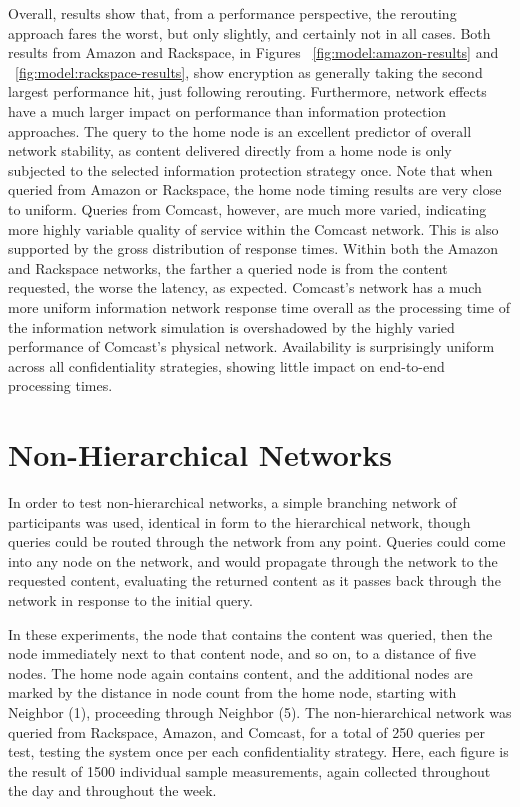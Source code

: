 Overall, results show that, from a performance perspective, the rerouting approach fares the worst, but only slightly, and certainly not in all cases.  Both results from Amazon and Rackspace, in Figures ~\ref{fig:model:amazon-results} and ~\ref{fig:model:rackspace-results}, show encryption as generally taking the second largest performance hit, just following rerouting.  Furthermore, network effects have a much larger impact on performance than information protection approaches.  The query to the home node is an excellent predictor of overall network stability, as content delivered directly from a home node is only subjected to the selected information protection strategy once.  Note that when queried from Amazon or Rackspace, the home node timing results are very close to uniform.  Queries from Comcast, however, are much more varied, indicating more highly variable quality of service within the Comcast network.  This is also supported by the gross distribution of response times.  Within both the Amazon and Rackspace networks, the farther a queried node is from the content requested, the worse the latency, as expected.  Comcast's network has a much more uniform information network response time overall as the processing time of the information network simulation is overshadowed by the highly varied performance of Comcast's physical network.  Availability is surprisingly uniform across all confidentiality strategies, showing little impact on end-to-end processing times.

\section{Non-Hierarchical Networks}
In order to test non-hierarchical networks, a simple branching network of participants was used, identical in form to the hierarchical network, though queries could be routed through the network from any point.  Queries could come into any node on the network, and would propagate through the network to the requested content, evaluating the returned content as it passes back through the network in response to the initial query.

In these experiments, the node that contains the content was queried, then the node immediately next to that content node, and so on, to a distance of five nodes.  The home node again contains content, and the additional nodes are marked by the distance in node count from the home node, starting with Neighbor (1), proceeding through Neighbor (5).  The non-hierarchical network was queried from Rackspace, Amazon, and Comcast, for a total of 250 queries per test, testing the system once per each confidentiality strategy.  Here, each figure is the result of 1500 individual sample measurements, again collected throughout the day and throughout the week.

